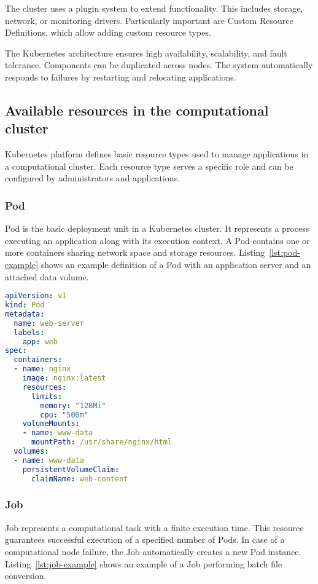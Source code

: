 The cluster uses a plugin system to extend functionality.
This includes storage, network, or monitoring drivers.
Particularly important are Custom Resource Definitions, which allow adding custom resource types.

The Kubernetes architecture ensures high availability, scalability, and fault tolerance.
Components can be duplicated across nodes.
The system automatically responds to failures by restarting and relocating applications.


\subsection{Available resources in the computational cluster}
Kubernetes platform defines basic resource types used to manage applications in a computational cluster.
Each resource type serves a specific role and can be configured by administrators and applications.

\subsubsection{Pod}
Pod is the basic deployment unit in a Kubernetes cluster. 
It represents a process executing an application along with its execution context.
A Pod contains one or more containers sharing network space and storage resources.
Listing~\ref{lst:pod-example} shows an example definition of a Pod with an application server and an attached data volume.

\begin{lstlisting}[language=yaml,caption={Example Pod definition},label={lst:pod-example}]
apiVersion: v1
kind: Pod
metadata:
  name: web-server
  labels:
    app: web
spec:
  containers:
  - name: nginx
    image: nginx:latest
    resources:
      limits:
        memory: "128Mi"
        cpu: "500m"
    volumeMounts:
    - name: www-data
      mountPath: /usr/share/nginx/html
  volumes:
  - name: www-data
    persistentVolumeClaim:
      claimName: web-content
\end{lstlisting}

\subsubsection{Job}
Job represents a computational task with a finite execution time. 
This resource guarantees successful execution of a specified number of Pods.
In case of a computational node failure, the Job automatically creates a new Pod instance.
Listing~\ref{lst:job-example} shows an example of a Job performing batch file conversion.


